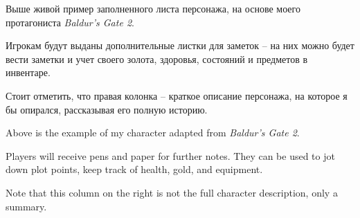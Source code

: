 \documentclass[a5paper,11pt]{book}
\begin{document}
\begin{multicols}{2}

\begin{ru}
Выше живой пример заполненного листа персонажа, на основе моего протагониста \emph{Baldur's Gate 2}.

Игрокам будут выданы дополнительные листки для заметок -- на них можно будет вести заметки и учет своего золота, здоровья, состояний и предметов в инвентаре.

Стоит отметить, что правая колонка -- краткое описание персонажа, на которое я бы опирался, рассказывая его полную историю.
\end{ru}

\begin{en}
Above is the example of my character adapted from \emph{Baldur's Gate 2}.

Players will receive pens and paper for further notes. They can be used to jot down plot points, keep track of health, gold, and equipment.

Note that this column on the right is not the full character description, only a summary.
\end{en}
\end{multicols}
\pagebreak

\end{document}
